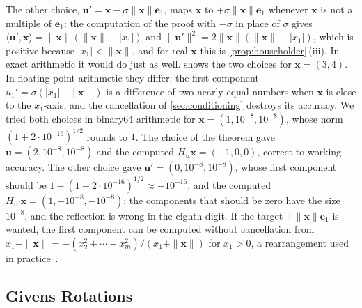 The other choice, $\mathbf u'=\mathbf x-\sigma\|\mathbf x\|\mathbf e_1$, maps $\mathbf x$ to $+\sigma\|\mathbf x\|\mathbf e_1$ whenever $\mathbf x$ is not a multiple of $\mathbf e_1$: the computation of the proof with $-\sigma$ in place of $\sigma$ gives $\langle\mathbf u',\mathbf x\rangle=\|\mathbf x\|(\|\mathbf x\|-|x_1|)$ and $\|\mathbf u'\|^2=2\|\mathbf x\|(\|\mathbf x\|-|x_1|)$, which is positive because $|x_1|<\|\mathbf x\|$, and for real $\mathbf x$ this is \cref{prop:householder}\,(iii). In exact arithmetic it would do just as well.  shows the two choices for $\mathbf x=(3,4)$. In floating-point arithmetic they differ: the first component $u_1'=\sigma(|x_1|-\|\mathbf x\|)$ is a difference of two nearly equal numbers when $\mathbf x$ is close to the $x_1$-axis, and the cancellation of \cref{sec:conditioning} destroys its accuracy. We tried both choices in binary64 arithmetic for $\mathbf x=(1,10^{-8},10^{-8})$, whose norm $(1+2\cdot10^{-16})^{1/2}$ rounds to $1$. The choice of the theorem gave $\mathbf u=(2,10^{-8},10^{-8})$ and the computed $H_{\mathbf u}\mathbf x=(-1,0,0)$, correct to working accuracy. The other choice gave $\mathbf u'=(0,10^{-8},10^{-8})$, whose first component should be $1-(1+2\cdot10^{-16})^{1/2}\approx-10^{-16}$, and the computed $H_{\mathbf u'}\mathbf x=(1,-10^{-8},-10^{-8})$: the components that should be zero have the size $10^{-8}$, and the reflection is wrong in the eighth digit. If the target $+\|\mathbf x\|\mathbf e_1$ is wanted, the first component can be computed without cancellation from $x_1-\|\mathbf x\|=-(x_2^2+\cdots+x_m^2)/(x_1+\|\mathbf x\|)$ for $x_1>0$, a rearrangement used in practice~\cite[Sect.~5.1]{golub2013}.

\subsection{Givens Rotations}

